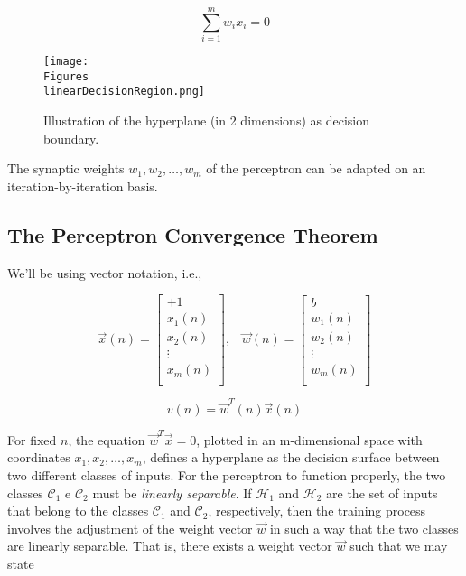 \documentclass[twocolumn]{article}
\newcommand{\somatorio}{\displaystyle\sum}
\begin{document}
 $$ \somatorio_{i = 1}^{m}w_{i}x_{i} = 0 $$

 \begin{figure}[H]
	 \center
	 \texttt{[image: \\Figures\\linearDecisionRegion.png]}
	 \caption{Illustration of the hyperplane (in 2 dimensions) as decision boundary.}
	 \label{linearDecisionRegion}
 \end{figure}

 The synaptic weights $ w_1, w_2, \ldots, w_m $ of the perceptron can be adapted on an iteration-by-iteration basis.

 \subsection{The Perceptron Convergence Theorem}
	 We'll be using vector notation, i.e.,

	 $$
		 \vec{x}(n) =
		 \begin{bmatrix}
			 +1        \\
			 x_{1} (n) \\
			 x_{2} (n) \\
			 \vdots    \\
			 x_{m} (n) \\
		 \end{bmatrix}
		 , \;\;\;
		 \vec{w} (n) =
		 \begin{bmatrix}
			 b         \\
			 w_{1} (n) \\
			 w_{2} (n) \\
			 \vdots    \\
			 w_{m} (n) \\
		 \end{bmatrix}
	 $$

	 $$
		 v(n) = \vec{w}^{T}(n) \vec{x} (n)
	 $$

	 For fixed $ n $, the equation $ \vec{w}^{T} \vec{x} = 0 $, plotted in an m-dimensional space with coordinates $ x_{1}, x_{2}, \ldots, x_{m} $, defines a hyperplane as the decision surface between two different classes of inputs. For the perceptron to function properly, the two classes $ \mathcal{C}_{1} $ e $ \mathcal{C}_{2} $ must be \textit{linearly separable}. If $ \mathcal{H}_{1} $ and $ \mathcal{H}_{2} $ are the set of inputs that belong to the classes $ \mathcal{C}_{1} $ and $ \mathcal{C}_{2} $, respectively, then the training process involves the adjustment of the weight vector $ \vec{w} $ in such a way that the two classes are linearly separable. That is, there exists a weight vector $ \vec{w} $ such that we may state
\end{document}

